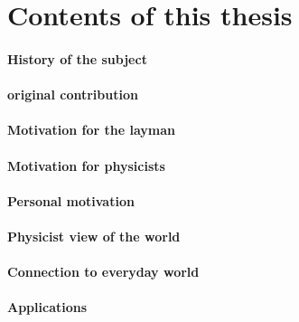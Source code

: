 \section*{Contents of this thesis}










\paragraph{History of the subject}


\paragraph{original contribution}

\paragraph{Motivation for the layman}
\paragraph{Motivation for physicists}
\paragraph{Personal motivation}


\paragraph{Physicist view of the world}

\paragraph{Connection to everyday world}

\paragraph{Applications}

